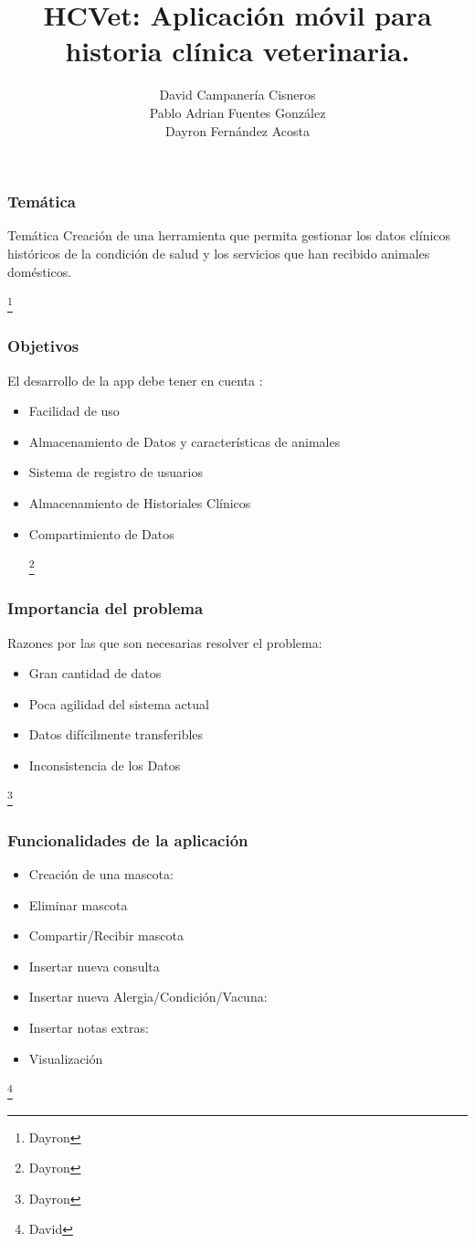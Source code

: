 \documentclass[14pt]{beamer}
\author[Campanería, Fernández, Fuentes]
{David Campanería Cisneros\\Pablo Adrian Fuentes González\\Dayron Fernández Acosta}
\title[Aplicación   HCVet]
{HCVet: Aplicación móvil para historia clínica veterinaria.}
\institute[UH]
{\textbf{Tutores:}\\ José Alejandro Mesejo Chiong\\ José Luis Castañeda Lorenzo}
\begin{document}
\begin{frame}
\titlepage
\end{frame}



\begin{frame}
\frametitle{Temática}
\begin{block}{Temática}
Creación de una herramienta que permita gestionar los datos clínicos históricos de la condición de salud y los servicios que han recibido animales domésticos.

\end{block}

\footnote{Dayron}
\end{frame}


\begin{frame}
\frametitle{Objetivos}
El desarrollo de la app debe tener en cuenta :
\begin{itemize}
\item Facilidad de uso
\item Almacenamiento de Datos y características de animales
\item Sistema de registro de usuarios
\item Almacenamiento de Historiales Clínicos
\item Compartimiento de Datos 

\footnote{Dayron}
\end{itemize}
\end{frame}

\begin{frame}
\frametitle{Importancia del problema}
Razones por las que son necesarias resolver el problema:
\begin{itemize}
\item Gran cantidad de datos
\item Poca agilidad del sistema actual
\item Datos difícilmente transferibles
\item Inconsistencia de los Datos
\end{itemize}
\footnote{Dayron}
\end{frame}

\begin{frame}
\frametitle{Funcionalidades de la aplicación}
\begin{itemize}
\item Creación de una mascota:
\item Eliminar mascota
\item Compartir/Recibir mascota
\item Insertar nueva consulta
\item Insertar nueva Alergia/Condición/Vacuna:
\item Insertar notas extras:
\item Visualización
\end{itemize}
\footnote{David}
\end{frame}
\end{document}

